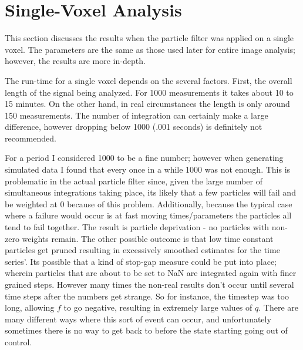 \section{Single-Voxel Analysis}
This section discusses the results when the particle filter was
applied on a single voxel. The parameters are the same as
those used later for entire image analysis; however, the results
are more in-depth. 

The run-time for a single voxel depends on the several factors. First, the
overall length of the signal being analyzed. For 1000 measurements it takes
about 10 to 15 minutes. On the other hand, in real circumstances the
length is only around 150 measurements. The number of  integration
can certainly make a large difference, however dropping below 1000 (.001 seconds)
is definitely not recommended. 

For a period I considered 1000 to be a
fine number; however when generating simulated data I found that every once
in a while 1000 was not enough. This is problematic in the actual particle
filter since, given the large number of simultaneous integrations taking 
place, its likely that a few particles will fail and be weighted at 0 because
of this problem. Additionally, because the typical case where a failure would
occur is at fast moving times/parameters the particles all tend to fail together.
The result is particle deprivation - no particles with non-zero weights remain.
The other possible outcome is that low time constant particles get pruned resulting
in excessively smoothed estimates for the time series'. Its possible that a
kind of stop-gap measure could be put into place; wherein particles that are
about to be set to NaN are integrated again with finer grained steps. However
many times the non-real results don't occur until several time steps after the 
numbers get strange. So for instance, the timestep was too long, allowing 
$f$ to go negative, resulting in extremely large values of $q$. There are many
different ways where this sort of event can occur, and unfortunately sometimes
there is no way to get back to before the state starting going out of control.

